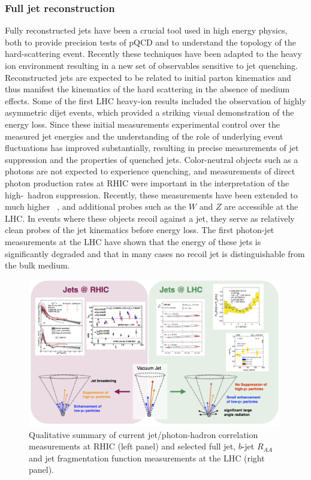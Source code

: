 \subsubsection{Full jet reconstruction}
\label{Sec:jet-reconstruct}
Fully reconstructed jets have been a crucial tool used in high energy
physics, both to provide precision tests of pQCD and to understand the
topology of the hard-scattering event. Recently these techniques have
been adapted to the heavy ion environment resulting in a new set of
observables sensitive to jet quenching. Reconstructed jets are
expected to be related to initial parton kinematics and thus manifest
the kinematics of the hard scattering in the absence of medium
effects. Some of the first LHC heavy-ion results included the
observation of highly asymmetric dijet events, which provided a
striking visual demonstration of the energy
loss\cite{Aad:2010bu,Chatrchyan:2011sx}. Since these initial
measurements experimental control over the measured jet energies and
the understanding of the role of underlying event fluctuations has
improved substantially, resulting in precise measurements of jet
suppression and the properties of quenched jets. Color-neutral objects
such as a photons are not expected to experience quenching, and
measurements of direct photon production rates at
RHIC\cite{Adler:2005ig} were important in the interpretation of the
high-\pT\ hadron suppression. Recently, these measurements have been
extended to much higher \pT\
\cite{Aamodt:2010jd,Abelev:2012hxa,CMS:2012aa}, and additional probes
such as the $W$ and $Z$ \cite{Chatrchyan:2012nt,Aad:2013sla,
Chatrchyan:2011ua,Aad:2012ew} are accessible at the LHC. In events
where these objects recoil against a jet, they serve as relatively
clean probes of the jet kinematics before energy loss. The first
photon-jet measurements at the LHC \cite{Chatrchyan:2012vq} have shown
that the energy of these jets is significantly degraded and that in
many cases no recoil jet is distinguishable from the bulk medium.

\begin{figure}[t]
\centerline{
\includegraphics[width=0.99\textwidth]{fig/JetProgressFig2_v2}}
\caption[Qualitative summary of current jet/photon-hadron correlation measurements]{Qualitative summary of current jet/photon-hadron correlation measurements at RHIC (left panel) and selected full jet, $b$-jet $R_{AA}$ and jet fragmentation function measurements at the LHC (right panel). }
\label{fig:JetProgressFig2}
\end{figure}


